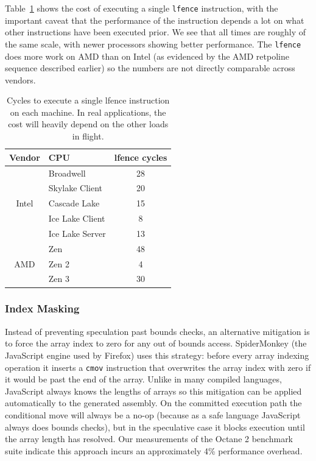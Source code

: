 Table~\ref{table:lfence} shows the cost of executing a single \texttt{lfence} instruction, with the important caveat that the performance of the instruction depends a lot on what other instructions have been executed prior.
We see that all times are roughly of the same scale, with newer processors showing better performance.
The \texttt{lfence} does more work on AMD than on Intel (as evidenced by the AMD retpoline sequence described earlier) so the numbers are not directly comparable across vendors.

\begin{table}[h]
  \begin{center}
  \begin{tabular}{ clc }
    \textbf{Vendor} & \textbf{CPU} & \textbf{lfence cycles} \\ \hline
    \multirow{5}{*}{Intel} & Broadwell        & 28 \\
                           & Skylake Client   & 20 \\
                           & Cascade Lake     & 15 \\
                           & Ice Lake Client  & 8 \\
                           & Ice Lake Server  & 13  \\ \hline
    \multirow{3}{*}{AMD}   & Zen              & 48 \\
                           & Zen 2            & 4 \\
                           & Zen 3            & 30 \\ \hline
  \end{tabular}
  \end{center}
  \caption{Cycles to execute a single lfence instruction on each machine.
    In real applications, the cost will heavily depend on the other loads in flight. }
  \label{table:lfence}
\end{table}

\subsubsection{Index Masking}

Instead of preventing speculation past bounds checks, an alternative mitigation is to force the array index to zero for any out of bounds access.
SpiderMonkey (the JavaScript engine used by Firefox) uses this
strategy: before every array indexing operation it inserts a
\texttt{cmov} instruction that overwrites the array index with zero if it would be past the end of the array.
Unlike in many compiled languages, JavaScript always knows the lengths of arrays so this mitigation can be applied automatically to the generated assembly.
On the committed execution path the conditional move will always be a no-op (because as a safe language JavaScript always does bounds checks), but in the speculative case it blocks execution until the array length has resolved.
Our measurements of the Octane 2 benchmark suite indicate this approach incurs an approximately 4\% performance overhead.

